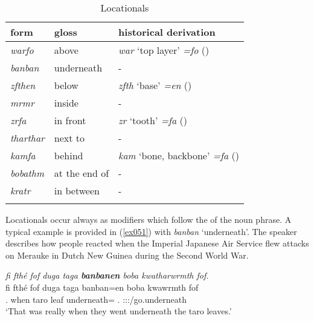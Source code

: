 \begin{table}
\caption{Locationals}
\label{locationals-table}
	\begin{tabularx}{.8\textwidth}{XXl}
		\lsptoprule
		form&{gloss}&{historical derivation}\\ \midrule
		\emph{warfo}&above&\emph{war} `top layer' \emph{=fo} ({\All})\\
		\emph{banban}&underneath&-\\
		\emph{zfthen}&below&\emph{zfth} `base' \emph{=en} ({\Loc})\\
		\emph{mrmr}&inside&-\\
		\emph{zrfa}&in front&\emph{zr} `tooth' \emph{=fa} ({\Abl})\\
		\emph{tharthar}&next to&-\\
		\emph{kamfa}&behind&\emph{kam} `bone, backbone' \emph{=fa} ({\Abl})\\
		\emph{bobathm}&at the end of&-\\
		\emph{kratr}&in between&-\\
		\lspbottomrule
	\end{tabularx}
\end{table}%

Locationals occur always as modifiers which follow the  of the noun phrase. A typical example is provided in (\ref{ex051}) with \emph{banban} `underneath'. The speaker describes how people reacted when the Imperial Japanese Air Service flew attacks on Merauke in Dutch New Guinea during the Second World War.

\begin{exe}
	\ex \emph{fi fthé fof duga taga \textbf{banbanen} boba kwatharwrmth fof.}\\
	\gll fi fthé fof duga taga banban=en boba kwawrmth fof\\
	\Tsg.{\Abs} when {\Emph} taro leaf underneath={\Loc} \Med.{\Abl} \Stpl:\Sbj:\Pst:\Dur/go.underneath {\Emph}\\
	\trans `That was really when they went underneath the taro leaves.'\\ 
	\label{ex051}
\end{exe}

